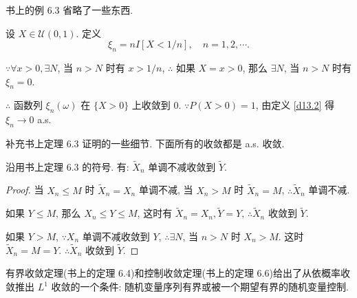 \documentclass[color=black,device=normal,lang=cn]{elegantnote}
\numberwithin{equation}{section}
\theoremstyle{plain}
\numberwithin{exercise}{exsection}
\begin{document}
书上的例 6.3 省略了一些东西.
\begin{example}
    设 $X\in\mathcal{U}(0,1)$. 定义
    \[\xi_n=nI[X<1/n],\quad n=1,2,\cdots.\]

    $\because\forall x>0,\exists N$, 当 $n>N$ 时有 $x>1/n$, $\therefore$ 如果 $X=x>0$, 那么 $\exists N$, 当 $n>N$ 时有 $\xi_n=0$.
    
    $\therefore$ 函数列 $\xi_n(\omega)$ 在 $\{X>0\}$ 上收敛到 $0$. $\because P(X>0)=1$, 由定义 \ref{d13.2} 得 $\xi_n\to0$ a.s.
\end{example}

补充书上定理 6.3 证明的一些细节. 下面所有的收敛都是 a.s. 收敛.
\begin{theorem}
    沿用书上定理 6.3 的符号. 有: $\tilde{X}_n$ 单调不减收敛到 $\tilde{Y}$.
\end{theorem}
\begin{proof}
    当 $X_n\leq M$ 时 $\tilde{X}_n=X_n$ 单调不减, 当 $X_n>M$ 时 $\tilde{X}_n=M$, $\therefore\tilde{X}_n$ 单调不减.

    如果 $Y\leq M$, 那么 $X_n\leq Y\leq M$, 这时有 $\tilde{X}_n=X_n,\tilde{Y}=Y$, $\therefore\tilde{X}_n$ 收敛到 $\tilde{Y}$.
    
    如果 $Y>M$, $\because X_n$ 单调不减收敛到 $Y$, $\therefore\exists N$, 当 $n>N$ 时 $X_n>M$. 这时 $\tilde{X}_n=M=Y$. $\therefore\tilde{X}_n$ 收敛到 $\tilde{Y}$.
\end{proof}

有界收敛定理(书上的定理 6.4)和控制收敛定理(书上的定理 6.6)给出了从依概率收敛推出 $L^1$ 收敛的一个条件: 随机变量序列有界或被一个期望有界的随机变量控制.
\end{document}
